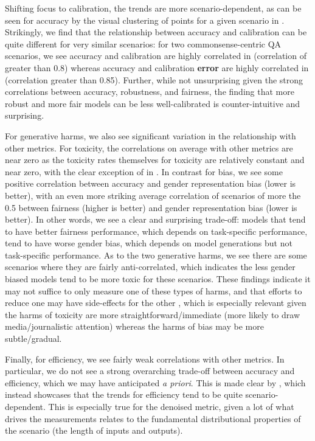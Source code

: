 Shifting focus to calibration, the trends are more scenario-dependent, as can be seen for accuracy by the visual clustering of points for a given scenario in . 
Strikingly, we find that the relationship between accuracy and calibration can be quite different for very similar scenarios: for two commonsense-centric QA scenarios, we see accuracy and calibration are highly correlated in \openbookqa (correlation of greater than 0.8) whereas accuracy and calibration \textbf{error} are highly correlated in \hellaswag (correlation greater than 0.85). 
Further, while not unsurprising given the strong correlations between accuracy, robustness, and fairness, the finding that more robust and more fair models can be less well-calibrated is counter-intuitive and surprising.

For generative harms, we also see significant variation in the relationship with other metrics.
For toxicity, the correlations on average with other metrics are near zero as the toxicity rates themselves for toxicity are relatively constant and near zero, with the clear exception of \narrativeqa in . 
In contrast for bias, we see some positive correlation between accuracy and gender representation bias (lower is better), with an even more striking average correlation of scenarios of more the 0.5 between fairness (higher is better) and gender representation bias (lower is better). 
In other words, we see a clear and surprising trade-off: models that tend to have better fairness performance, which depends on task-specific performance, tend to have worse gender bias, which depends on model generations but not task-specific performance.
As to the two generative harms, we see there are some scenarios where they are fairly anti-correlated, which indicates the less gender biased models tend to be more toxic for these scenarios.
These findings indicate it may not suffice to only measure one of these types of harms, and that efforts to reduce one may have side-effects for the other \citep[\cf][]{xu2021detoxifying}, which is especially relevant given the harms of toxicity are more straightforward/immediate (\eg more likely to draw media/journalistic attention) whereas the harms of bias may be more subtle/gradual. 

Finally, for efficiency, we see fairly weak correlations with other metrics.
In particular, we do not see a strong overarching trade-off between accuracy and efficiency, which we may have anticipated \textit{a priori}.
This is made clear by , which instead showcases that the trends for efficiency tend to be quite scenario-dependent.
This is especially true for the denoised metric, given a lot of what drives the measurements relates to the fundamental distributional properties of the scenario (\ie the length of inputs and outputs).

